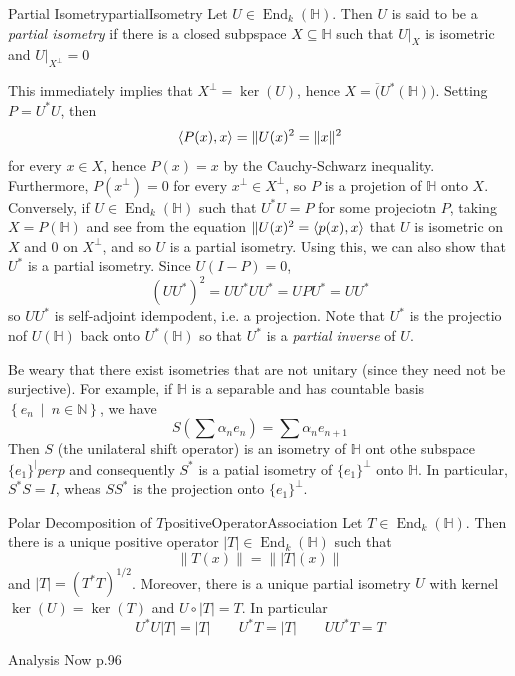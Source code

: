 \documentclass[oneside]{book}
\newcommand{\N}{\mathbb{N}}
\renewcommand{\H}{\mathbb{H}}
\newcommand{\sse}{\subseteq}
\newcommand{\oln}{\overline}
\newcommand{\End}{\operatorname{End}}
\newcommand{\set}[2]{\left\{#1 \ \middle|\ #2\right\}}
\begin{document}
\begin{defn}{Partial Isometry}{partialIsometry}
	Let $U \in \End_k(\H)$. Then $U$ is said to be a \emph{partial isometry} if there is a closed
	subpspace $X \sse \H$ such that $U|_{X}$ is isometric and $U|_{X^\perp} = 0$
\end{defn}

This immediately implies that $X^\perp = \ker(U)$, hence $X = \oln(U^*(\H))$. Setting $P = U^*U$, then
\[
	\langle P(x), x \rangle = \|U(x)\\^2 = \|x\|^2
\]
for every $x \in X$, hence $P(x) = x$ by the Cauchy-Schwarz inequality. Furthermore, $P(x^\perp) = 0$ for every
$x^\perp \in X^\perp$, so $P$ is a projetion of $\H$ onto $X$. Conversely, if $U \in \End_k(\H)$ such that $U^*U
= P$ for some projeciotn $P$, taking $X = P(\H)$ and see from the equation $\|U(x)\\^2 = \langle p(x), x \rangle$
that $U$ is isometric on $X$ and $0$ on $X^\perp$, and so $U$ is a partial isometry. Using this, we can also show that
$U^*$ is a partial isometry. Since $U(I-P)= 0$,
\[
	(UU^*)^2 = UU^*UU^* = UPU^* =UU^*
\]
so $UU^*$ is self-adjoint idempodent, i.e. a projection. Note that $U^*$ is the projectio nof $U(\H)$ back onto
$U^*(\H)$ so that $U^*$ is a \emph{partial inverse} of $U$.

Be weary that there exist isometries that are not unitary (since they need not be surjective). For example, if $\H$ is
a separable and has countable basis $ \set{e_n}{n \in \N}$, we have
\[
	S \left( \sum \alpha_n e_n \right) = \sum \alpha_n e_{n+1}
\]
Then $S$ (the unilateral shift operator) is an isometry of $\H$ ont othe subspace $\{e_1\}^|perp$ and consequently
$S^*$ is a patial isometry of $\{e_1\}^{\perp}$ onto $\H$. In particular, $S^*S = I$, wheas $SS^*$ is the projection
onto $\{e_1\}^{\perp}$.

\begin{thm}{Polar Decomposition of $T$}{positiveOperatorAssociation}
	Let $T \in \End_k(\H)$. Then there is a unique positive operator $|T| \in \End_k(\H)$ such that
	\[
		\|T(x)\| = \||T|(x)\|
	\]
	and $|T| = (T^*T)^{1/2}$. Moreover, there is a unique partial isometry $U$ with kernel $\ker(U)
	= \ker(T)$ and $U\circ |T| = T$. In particular
	\[
		U^*U|T| = |T| \qquad U^*T = |T| \qquad UU^*T = T
	\]
\end{thm}

\begin{Proof}
	Analysis Now p.96
\end{Proof}
\end{document}

